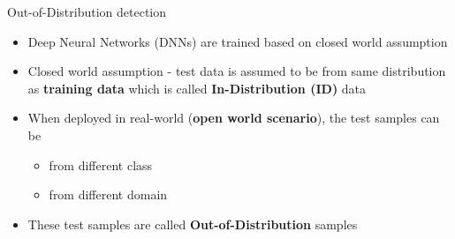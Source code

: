 \documentclass[aspectratio=169]{beamer}
\begin{document}
\begin{frame}{Out-of-Distribution detection}
    \begin{itemize}
        \item Deep Neural Networks (DNNs) are trained based on closed world assumption
        \item Closed world assumption - test data is assumed to be from same distribution as \textbf{training data} which is called \textbf{In-Distribution (ID)} data
        \item When deployed in real-world (\textbf{open world scenario}), the test samples can be
        \begin{itemize}
            \item from different class
            \item from different domain 
        \end{itemize}
        \item These test samples are called \textbf{Out-of-Distribution} samples
    \end{itemize}
\end{frame}
\end{document}
